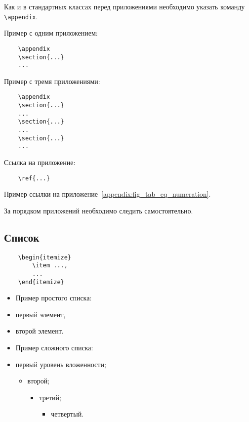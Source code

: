 \documentclass[14pt, a4paper, titlepage]{extarticle}
\renewcommand{\thesection}{\Asbuk{section}}
\let\oldsec\section
\renewcommand{\section}{
		\clearpage
		\phantomsection
		\refstepcounter{section}
		\setcounter{figure}{0} %
		\setcounter{table}{0} %
		\setcounter{equation}{0} %
		\addcontentsline{toc}{section}{\appendixname~\thesection}
		\oldsec*} %
\begin{document}
Как и в стандартных классах перед приложениями необходимо указать команду \verb"\appendix".

Пример с одним приложением:
\begin{verbatim}
	\appendix
	\section{...}
	...
\end{verbatim}

Пример с тремя приложениями:
\begin{verbatim}
	\appendix
	\section{...}
	...
	\section{...}
	...
	\section{...}
	...
\end{verbatim}

Ссылка на приложение:
\begin{verbatim}
	\ref{...}
\end{verbatim}

Пример ссылки на приложение~\ref{appendix:fig_tab_eq_numeration}.

За порядком приложений необходимо следить самостоятельно.

\subsection{Список}

\begin{verbatim}
	\begin{itemize}
		\item ...,
		...
	\end{itemize}
\end{verbatim}

\begin{itemize}
	\item[] Пример простого списка:
	\item первый элемент,
	\item второй элемент.
\end{itemize}

\begin{itemize}
	\item[] Пример сложного списка:
	\item первый уровень вложенности;
	\begin{itemize}
		\item второй;
		\begin{itemize}
			\item третий;
			\begin{itemize}
				\item четвертый.
			\end{itemize}
		\end{itemize}
	\end{itemize}
\end{itemize}
\end{document}
